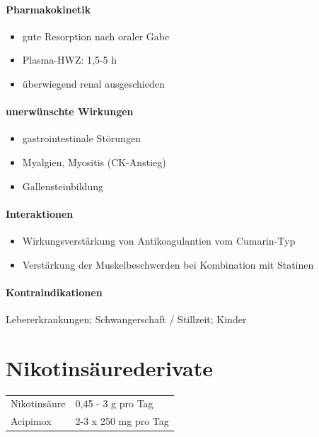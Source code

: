 \documentclass[10pt,a4paper]{report}
\begin{document}
\paragraph{Pharmakokinetik} %
\label{par:pharmakokinetik}
\begin{itemize}
	\item gute Resorption nach oraler Gabe
	\item Plasma-HWZ: 1,5-5 h
	\item überwiegend renal ausgeschieden
\end{itemize}
\paragraph{unerwünschte Wirkungen} %
\label{par:unerw_nschte_wirkungen}
\begin{itemize}
	\item gastrointestinale Störungen
	\item Myalgien, Myositis (CK-Anstieg)
	\item Gallensteinbildung
\end{itemize}
\paragraph{Interaktionen} %
\label{par:interaktionen}
\begin{itemize}
	\item Wirkungsverstärkung von Antikoagulantien vom Cumarin-Typ
	\item Verstärkung der Muskelbeschwerden bei Kombination mit Statinen
\end{itemize}
\paragraph{Kontraindikationen} %
\label{par:kontrain}
Lebererkrankungen; Schwangerschaft / Stillzeit; Kinder
\section{Nikotinsäurederivate} %
\label{sec:nikotins_urederivate}
\begin{tabularx}{\textwidth}{XX}
Nikotinsäure&0,45 - 3 g pro Tag\\
Acipimox&2-3 x 250 mg pro Tag\\
\end{tabularx}
\end{document}
